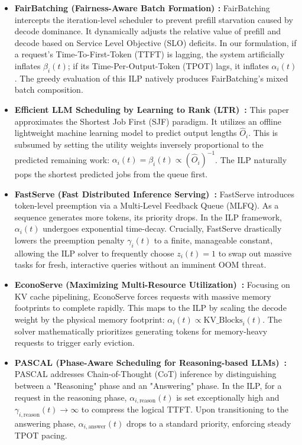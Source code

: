 \documentclass[11pt]{article}
\begin{document}
\begin{itemize}
    \item \textbf{FairBatching (Fairness-Aware Batch Formation) \citep{lyu2025fairbatching}:} FairBatching intercepts the iteration-level scheduler to prevent prefill starvation caused by decode dominance. It dynamically adjusts the relative value of prefill and decode based on Service Level Objective (SLO) deficits. In our formulation, if a request's Time-To-First-Token (TTFT) is lagging, the system artificially inflates $\beta_i(t)$; if its Time-Per-Output-Token (TPOT) lags, it inflates $\alpha_i(t)$. The greedy evaluation of this ILP natively produces FairBatching's mixed batch composition.
    
    \item \textbf{Efficient LLM Scheduling by Learning to Rank (LTR)~\citep{fu2024efficient}:} This paper approximates the Shortest Job First (SJF) paradigm. It utilizes an offline lightweight machine learning model to predict output lengths $\hat{O}_i$. This is subsumed by setting the utility weights inversely proportional to the predicted remaining work: $\alpha_i(t) = \beta_i(t) \propto (\hat{O}_i)^{-1}$. The ILP naturally pops the shortest predicted jobs from the queue first.
    
    \item \textbf{FastServe (Fast Distributed Inference Serving)~\citep{wu2023fast}:} FastServe introduces token-level preemption via a Multi-Level Feedback Queue (MLFQ). As a sequence generates more tokens, its priority drops. In the ILP framework, $\alpha_i(t)$ undergoes exponential time-decay. Crucially, FastServe drastically lowers the preemption penalty $\gamma_i(t)$ to a finite, manageable constant, allowing the ILP solver to frequently choose $z_i(t) = 1$ to swap out massive tasks for fresh, interactive queries without an imminent OOM threat.
    
    \item \textbf{EconoServe (Maximizing Multi-Resource Utilization)~\citep{shen2024econoserve}:} Focusing on KV cache pipelining, EconoServe forces requests with massive memory footprints to complete rapidly. This maps to the ILP by scaling the decode weight by the physical memory footprint: $\alpha_i(t) \propto \text{KV\_Blocks}_i(t)$. The solver mathematically prioritizes generating tokens for memory-heavy requests to trigger early eviction.
    
    \item \textbf{PASCAL (Phase-Aware Scheduling for Reasoning-based LLMs)~\citep{cho2026pascal}:} PASCAL addresses Chain-of-Thought (CoT) inference by distinguishing between a "Reasoning" phase and an "Answering" phase. In the ILP, for a request in the reasoning phase, $\alpha_{i, \text{reason}}(t)$ is set exceptionally high and $\gamma_{i, \text{reason}}(t) \to \infty$ to compress the logical TTFT. Upon transitioning to the answering phase, $\alpha_{i, \text{answer}}(t)$ drops to a standard priority, enforcing steady TPOT pacing.
    

\end{itemize}
\end{document}
